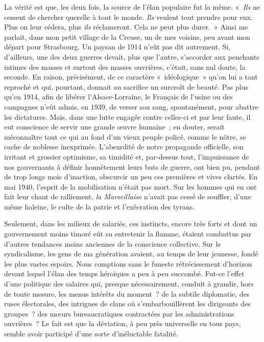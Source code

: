 \documentclass[french,twoside]{book} %
\begin{document}
La vérité est que, les deux fois, la source de l’élan   populaire fut la même. « \emph{Ils} ne cessent de chercher querelle à tout le monde. \emph{Ils} veulent tout prendre pour eux. Plus on leur cédera, plus \emph{ils} réclameront. Cela ne peut plus durer. » Ainsi me parlait, dans mon petit village de la Creuse, un de mes voisins, peu avant mon départ pour Strasbourg. Un paysan de 1914 n’eût pas dit autrement. Si, d’ailleurs, une des deux guerres devait, plus que l’autre, s’accorder aux penchants intimes des masses et surtout des masses ouvrières, c’était, sans nul doute, la seconde. En raison, précisément, de ce caractère « idéologique » qu’on lui a tant reproché et qui, pourtant, donnait au sacrifice un surcroît de beauté. Pas plus qu’en 1914, afin de libérer l’Alsace-Lorraine, le Français de l’usine ou des campagnes n’eût admis, en 1939, de verser son sang, spontanément, pour abattre les dictatures. Mais, dans une lutte engagée contre celles-ci et par leur faute, il eut conscience de servir une grande œuvre humaine ; en douter, serait méconnaître tout ce qui au fond d’un vieux peuple policé, comme le nôtre, se cache de noblesse inexprimée. L’absurdité de notre propagande officielle, son irritant et grossier optimisme, sa timidité et, par-dessus tout, l’impuissance de nos gouvernants à définir honnêtement leurs buts de guerre, ont bien pu, pendant de trop longs mois d’inaction, obscurcir un peu ces premières et vives clartés. En mai 1940, l’esprit de la mobilisation n’était pas mort. Sur les hommes qui en ont fait leur chant de ralliement, \emph{la Marseillaise} n’avait pas cessé de souffler, d’une même haleine, le culte de la patrie et l’exécration des tyrans.\par
Seulement, dans les milieux de salariés, ces instincts, encore très forts et dont un gouvernement moins timoré eût su entretenir la flamme, étaient combattus par d’autres tendances moins anciennes de la conscience collective. Sur le syndicalisme, les gens de ma génération avaient, au temps de leur jeunesse, fondé les plus vastes espoirs. Nous   comptions sans le funeste rétrécissement d’horizon devant lequel l’élan des temps héroïques a peu à peu succombé. Fut-ce l’effet d’une politique des salaires qui, presque nécessairement, conduit à grandir, hors de toute mesure, les menus intérêts du moment ? de la subtile diplomatie, des ruses électorales, des intrigues de clans où s’embarbouillèrent les dirigeants des groupes ? des mœurs bureaucratiques contractées par les administrations ouvrières ? Le fait est que la déviation, à peu près universelle en tous pays, semble avoir participé d’une sorte d’inéluctable fatalité.\par
\end{document}
